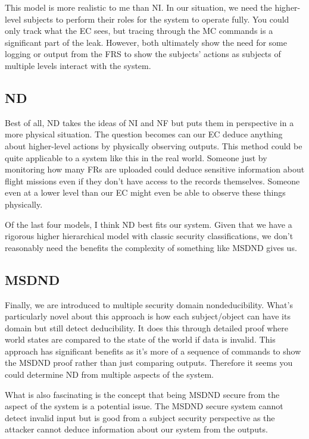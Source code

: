 \documentclass[10pt,journal,compsoc]{IEEEtran}
\begin{document}
This model is more realistic to me than NI. In our situation, we need the higher-level subjects to perform their roles for the system to operate fully. You could only track what the EC sees, but tracing through the MC commands is a significant part of the leak. However, both ultimately show the need for some logging or output from the FRS to show the subjects' actions as subjects of multiple levels interact with the system.

\subsection{ND}

Best of all, ND takes the ideas of NI and NF but puts them in perspective in a more physical situation. The question becomes can our EC deduce anything about higher-level actions by physically observing outputs. This method could be quite applicable to a system like this in the real world. Someone just by monitoring how many FRs are uploaded could deduce sensitive information about flight missions even if they don't have access to the records themselves. Someone even at a lower level than our EC might even be able to observe these things physically. 

Of the last four models, I think ND best fits our system. Given that we have a rigorous higher hierarchical model with classic security classifications, we don't reasonably need the benefits the complexity of something like MSDND gives us. 

\subsection{MSDND}

Finally, we are introduced to multiple security domain nondeducibility. What's particularly novel about this approach is how each subject/object can have its domain but still detect deducibility. It does this through detailed proof where world states are compared to the state of the world if data is invalid. This approach has significant benefits as it's more of a sequence of commands to show the MSDND proof rather than just comparing outputs. Therefore it seems you could determine ND from multiple aspects of the system. 

What is also fascinating is the concept that being MSDND secure from the aspect of the system is a potential issue. The MSDND secure system cannot detect invalid input but is good from a subject security perspective as the attacker cannot deduce information about our system from the outputs. 
\end{document}
